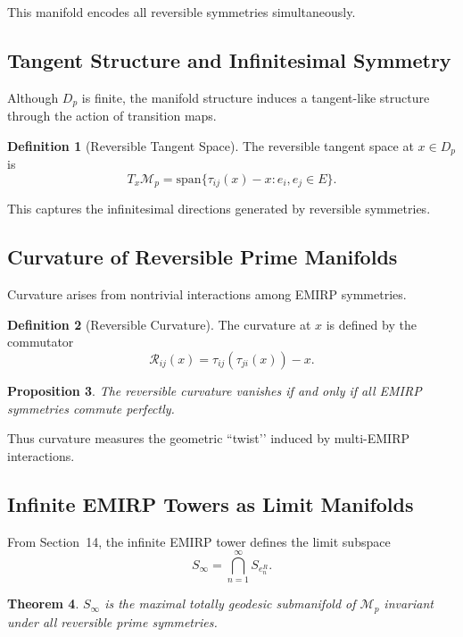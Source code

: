 \documentclass[11pt]{article}
\theoremstyle{definition}
\newtheorem{definition}{Definition}[section]
\theoremstyle{plain}
\newtheorem{theorem}[definition]{Theorem}
\newtheorem{proposition}[definition]{Proposition}
\theoremstyle{remark}
\begin{document}
This manifold encodes all reversible symmetries simultaneously.

\subsection{Tangent Structure and Infinitesimal Symmetry}

Although $D_p$ is finite, the manifold structure induces a tangent-like
structure through the action of transition maps.

\begin{definition}[Reversible Tangent Space]
The reversible tangent space at $x \in D_p$ is
\[
T_x \mathcal{M}_p = \mathrm{span}\{\tau_{ij}(x) - x : e_i, e_j \in E\}.
\]
\end{definition}

This captures the infinitesimal directions generated by reversible
symmetries.

\subsection{Curvature of Reversible Prime Manifolds}

Curvature arises from nontrivial interactions among EMIRP symmetries.

\begin{definition}[Reversible Curvature]
The curvature at $x$ is defined by the commutator
\[
\mathcal{R}_{ij}(x) = \tau_{ij}(\tau_{ji}(x)) - x.
\]
\end{definition}

\begin{proposition}
The reversible curvature vanishes if and only if all EMIRP symmetries
commute perfectly.
\end{proposition}

Thus curvature measures the geometric ``twist’’ induced by multi-EMIRP
interactions.

\subsection{Infinite EMIRP Towers as Limit Manifolds}

From Section~14, the infinite EMIRP tower defines the limit subspace
\[
S_\infty = \bigcap_{n=1}^\infty S_{e_n^R}.
\]

\begin{theorem}
$S_\infty$ is the maximal totally geodesic submanifold of
$\mathcal{M}_p$ invariant under all reversible prime symmetries.
\end{theorem}
\end{document}
